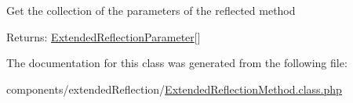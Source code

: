 Get the collection of the parameters of the reflected method

\begin{Desc}
\item[Returns:]\hyperlink{class_extended_reflection_parameter}{ExtendedReflectionParameter}\mbox{[}\mbox{]} \end{Desc}


The documentation for this class was generated from the following file:\begin{CompactItemize}
\item 
components/extendedReflection/\hyperlink{_extended_reflection_method_8class_8php}{ExtendedReflectionMethod.class.php}\end{CompactItemize}
